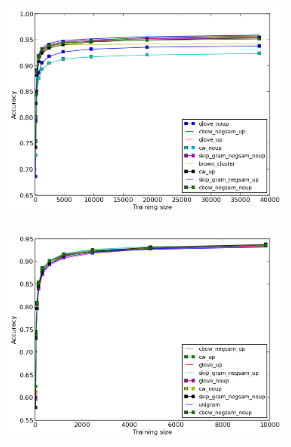 \documentclass[11pt]{article}
\begin{document}

\begin{figure}
\caption{Best results for each method for POS and Chunking}
\centering
\begin{subfigure}{.5\textwidth}
	\centering
    \includegraphics[width=0.8\textwidth]{plots/bestPOS.png}
	\label{fig:bestpos}
\end{subfigure}%
\begin{subfigure}{.5\textwidth}
	\centering
    \includegraphics[width=0.8\textwidth]{plots/bestChunking.png}
	\label{fig:bestchunking}
\end{subfigure}
\end{figure}
\end{document}
